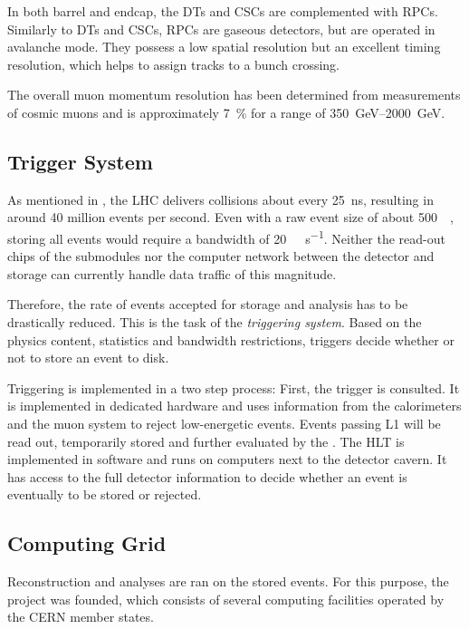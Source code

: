 In both barrel and endcap, the \acp{DT} and \acp{CSC} are complemented with \acp{RPC}. Similarly to \acp{DT} and \acp{CSC}, \acp{RPC} are gaseous detectors, but are operated in avalanche mode. They possess a low spatial resolution but an excellent timing resolution, which helps to assign tracks to a bunch crossing.

The overall muon momentum resolution has been determined from measurements of cosmic muons and is approximately \SI{7}{\percent} for a \pT range of \SIrange{350}{2000}{\GeV}\cite{CMSCollaboration:PerformanceCMSmuon}.

\subsection{Trigger System}
\label{sec:triggering}
As mentioned in , the \ac{LHC} delivers collisions about every \SI{25}{\nano\second}, resulting in around \num{40} million events per second. Even with a raw event size of about \SI{500}{\kilo\byte}\cite{CMSCollaboration:CMStriggersystem}, storing all events would require a bandwidth of \SI{20}{\tera\byte\per\second}. Neither the read-out chips of the submodules nor the computer network between the detector and storage can currently handle data traffic of this magnitude.

Therefore, the rate of events accepted for storage and analysis has to be drastically reduced. This is the task of the \emph{triggering system}. Based on the physics content, statistics and bandwidth restrictions, triggers decide whether or not to store an event to disk.

Triggering is implemented in a two step process: First, the  trigger is consulted. It is implemented in dedicated hardware and uses information from the calorimeters and the muon system to reject low-energetic events. Events passing \ac{L1} will be read out, temporarily stored and further evaluated by the . The \ac{HLT} is implemented in software and runs on computers next to the detector cavern. It has access to the full detector information to decide whether an event is eventually to be stored or rejected\cite{CMSCollaboration:CMStriggersystem}.

\subsection{Computing Grid}
Reconstruction and analyses are ran on the stored events. For this purpose, the  project was founded, which consists of several computing facilities operated by the \ac{CERN} member states.

